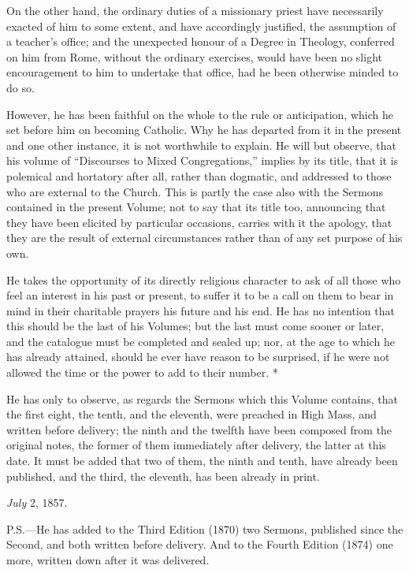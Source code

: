 On the other hand, the ordinary
duties of a missionary priest have necessarily exacted of
him to some extent, and have accordingly justified, the
assumption of a teacher's office; and the unexpected
honour of a Degree in Theology, conferred on him from
Rome, without the ordinary exercises, would have been no
slight encouragement to him to undertake that office, had
he been otherwise minded to do so.


However, he has been faithful on
the whole to the rule or anticipation, which he set
before him on becoming Catholic. Why he has departed from
it in the present and one other instance, it is not
worthwhile to explain. He will but observe, that his
volume of ``Discourses to Mixed Congregations,''
implies by its title, that it is polemical and hortatory
after all, rather than dogmatic, and addressed to those
who are external to the Church. This is partly the case
also with the Sermons contained in the present Volume;
not to say that its title too, announcing that they have
been elicited by particular occasions, carries with it
the apology, that they are the result of external
circumstances rather than of any set purpose of his own.


He takes the opportunity of its
directly religious character to ask of all those who feel
an interest in his past or present, to suffer it to be a
call on them to bear in mind in their charitable prayers
his future and his end. He has no intention that this
should be the last of his Volumes; but the last must come
sooner or later, and the catalogue must be completed and
sealed up; nor, at the age to which he has already
attained, should he ever have reason to be surprised, if
he were not allowed the time or the power to add to their
number. *


He has only to observe, as
regards the Sermons which this Volume contains, that the
first eight, the tenth, and the eleventh, were preached
in High Mass, and written before delivery; the ninth and
the twelfth have been composed from the original notes,
the former of them immediately after delivery, the latter
at this date. It must be added that two of them, the
ninth and tenth, have already been published, and the
third, the eleventh, has been already in print.


\emph{July} 2, 1857.


P.S.—He has added to the
Third Edition (1870) two Sermons, published since the
Second, and both written before delivery. And to the
Fourth Edition (1874) one more, written down after it was
delivered.


